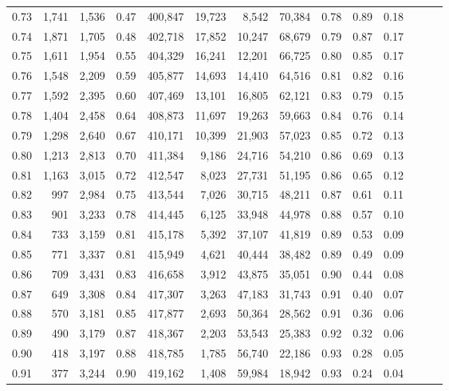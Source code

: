 \begin{tabular}{rrrrrrrrrrrrrr}
0.73 &  1,741 &  1,536 &  0.47 &  400,847 &   19,723 &   8,542 &  70,384 &  0.78 &  0.89 &      0.18 \\
0.74 &  1,871 &  1,705 &  0.48 &  402,718 &   17,852 &  10,247 &  68,679 &  0.79 &  0.87 &      0.17 \\
0.75 &  1,611 &  1,954 &  0.55 &  404,329 &   16,241 &  12,201 &  66,725 &  0.80 &  0.85 &      0.17 \\
0.76 &  1,548 &  2,209 &  0.59 &  405,877 &   14,693 &  14,410 &  64,516 &  0.81 &  0.82 &      0.16 \\
0.77 &  1,592 &  2,395 &  0.60 &  407,469 &   13,101 &  16,805 &  62,121 &  0.83 &  0.79 &      0.15 \\
0.78 &  1,404 &  2,458 &  0.64 &  408,873 &   11,697 &  19,263 &  59,663 &  0.84 &  0.76 &      0.14 \\
0.79 &  1,298 &  2,640 &  0.67 &  410,171 &   10,399 &  21,903 &  57,023 &  0.85 &  0.72 &      0.13 \\
0.80 &  1,213 &  2,813 &  0.70 &  411,384 &    9,186 &  24,716 &  54,210 &  0.86 &  0.69 &      0.13 \\
0.81 &  1,163 &  3,015 &  0.72 &  412,547 &    8,023 &  27,731 &  51,195 &  0.86 &  0.65 &      0.12 \\
0.82 &    997 &  2,984 &  0.75 &  413,544 &    7,026 &  30,715 &  48,211 &  0.87 &  0.61 &      0.11 \\
0.83 &    901 &  3,233 &  0.78 &  414,445 &    6,125 &  33,948 &  44,978 &  0.88 &  0.57 &      0.10 \\
0.84 &    733 &  3,159 &  0.81 &  415,178 &    5,392 &  37,107 &  41,819 &  0.89 &  0.53 &      0.09 \\
0.85 &    771 &  3,337 &  0.81 &  415,949 &    4,621 &  40,444 &  38,482 &  0.89 &  0.49 &      0.09 \\
0.86 &    709 &  3,431 &  0.83 &  416,658 &    3,912 &  43,875 &  35,051 &  0.90 &  0.44 &      0.08 \\
0.87 &    649 &  3,308 &  0.84 &  417,307 &    3,263 &  47,183 &  31,743 &  0.91 &  0.40 &      0.07 \\
0.88 &    570 &  3,181 &  0.85 &  417,877 &    2,693 &  50,364 &  28,562 &  0.91 &  0.36 &      0.06 \\
0.89 &    490 &  3,179 &  0.87 &  418,367 &    2,203 &  53,543 &  25,383 &  0.92 &  0.32 &      0.06 \\
0.90 &    418 &  3,197 &  0.88 &  418,785 &    1,785 &  56,740 &  22,186 &  0.93 &  0.28 &      0.05 \\
0.91 &    377 &  3,244 &  0.90 &  419,162 &    1,408 &  59,984 &  18,942 &  0.93 &  0.24 &      0.04 \\

\end{tabular}

